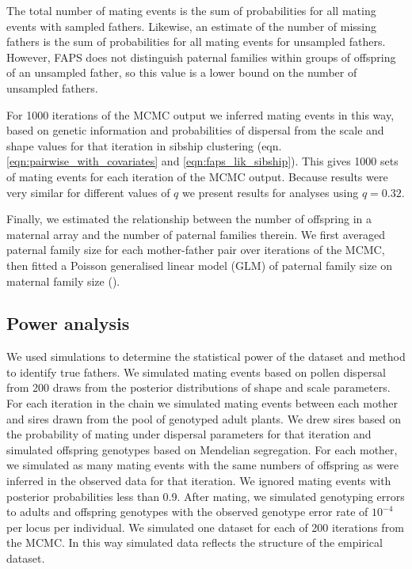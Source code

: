 \documentclass[10pt, a4paper, twocolumn]{article} %
\begin{document}
The total number of mating events is the sum of probabilities for all mating events with sampled fathers. Likewise, an estimate of the number of missing fathers is the sum of probabilities for all mating events for unsampled fathers. However, FAPS does not distinguish paternal families within groups of offspring of an unsampled father, so this value is a lower bound on the number of unsampled fathers.

For 1000 iterations of the MCMC output we inferred mating events in this way, based on genetic information and probabilities of dispersal from the scale and shape values for that iteration in sibship clustering (eqn. \ref{eqn:pairwise_with_covariates} and \ref{eqn:faps_lik_sibship}). This gives 1000 sets of mating events for each iteration of the MCMC output. Because results were very similar for different values of $q$ we present results for analyses using $q=0.32$.

Finally, we estimated the relationship between the number of offspring in a maternal array and the number of paternal families therein. We first averaged paternal family size for each mother-father pair over iterations of the MCMC, then fitted a Poisson generalised linear model (GLM) of paternal family size on maternal family size (\cite{McCullagh1989}).

\subsection{Power analysis}

We used simulations to determine the statistical power of the dataset and method to identify true fathers. We simulated mating events based on pollen dispersal from 200 draws from the posterior distributions of shape and scale parameters. For each iteration in the chain we simulated mating events between each mother and sires drawn from the pool of genotyped adult plants. We drew sires based on the probability of mating under dispersal parameters for that iteration and simulated offspring genotypes based on Mendelian segregation. For each mother, we simulated as many mating events with the same numbers of offspring as were inferred in the observed data for that iteration. We ignored mating events with posterior probabilities less than 0.9. After mating, we simulated genotyping errors to adults and offspring genotypes with the observed genotype error rate of $10^{-4}$ per locus per individual. We simulated one dataset for each of 200 iterations from the MCMC. In this way simulated data reflects the structure of the empirical dataset.
\end{document}
